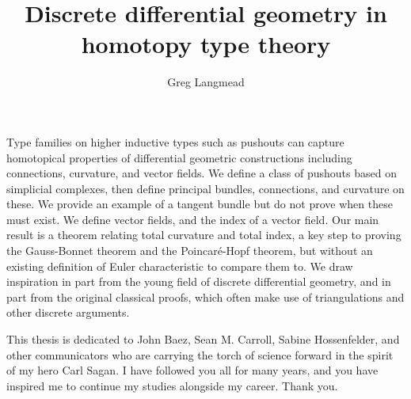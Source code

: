 \documentclass[12pt,fleqn]{article}
\title{Discrete differential geometry in homotopy type theory}
\author{Greg Langmead}
\numberwithin{equation}{section}
\renewenvironment{abstract}{\section*{\abstractname}}{}
\begin{document}
\maketitle

\begin{abstract}
Type families on higher inductive types such as pushouts can capture homotopical properties of differential geometric constructions including connections, curvature, and vector fields. We define a class of pushouts based on simplicial complexes, then define principal bundles, connections, and curvature on these. We provide an example of a tangent bundle but do not prove when these must exist. We define vector fields, and the index of a vector field. Our main result is a theorem relating total curvature and total index, a key step to proving the Gauss-Bonnet theorem and the Poincaré-Hopf theorem, but without an existing definition of Euler characteristic to compare them to. We draw inspiration in part from the young field of discrete differential geometry, and in part from the original classical proofs, which often make use of triangulations and other discrete arguments.
\end{abstract}

\begin{dedication}
This thesis is dedicated to John Baez, Sean M. Carroll, Sabine Hossenfelder, and other communicators who are carrying the torch of science forward in the spirit of my hero Carl Sagan. I have followed you all for many years, and you have inspired me to continue my studies alongside my career. Thank you.
\end{dedication}

\listoftodos
\clearpage


\tableofcontents 
\clearpage

\clearpage

\clearpage

\clearpage

\clearpage

\clearpage

\clearpage
\appendix

\clearpage


\end{document}
